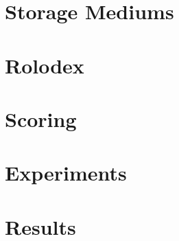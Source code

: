 \section{Storage Mediums} %
\label{sec:storage_mediums}


\section{Rolodex} %
\label{sec:rolodex}


\section{Scoring} %
\label{sec:scoring}


\section{Experiments} %
\label{sec:experiments_storage}


\section{Results} %
\label{sec:results_storage}

